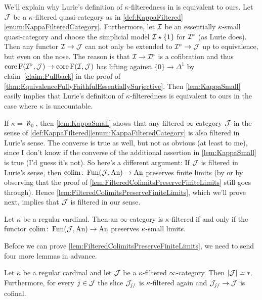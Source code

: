 \begin{rem}\label{rem:LuriesFilteredness}
	We'll explain why Lurie's definition of $\kappa$-filteredness in \cite[Definition~]{HTT} is equivalent to ours. Let $\mathcal{J}$ be a $\kappa$-filtered quasi-category as in \cref{def:KappaFiltered}\cref{enum:KappaFilteredCategory}. Furthermore, let $\mathcal{I}$ be an essentially $\kappa$-small quasi-category and choose the simplicial model $\mathcal{I}\star\{1\}$ for $\mathcal{I}^\triangleright$ (as Lurie does). Then any functor $\mathcal{I}\rightarrow\mathcal{J}$ can not only be extended to $\mathcal{I}^\triangleright\rightarrow\mathcal{J}$ up to equivalence, but even on the nose. The reason is that $\mathcal{I}\rightarrow\mathcal{I}^\triangleright$ is a cofibration and thus $\operatorname{core}\operatorname{F}(\mathcal{I}^\triangleright,\mathcal{J})\rightarrow \operatorname{core}\operatorname{F}(\mathcal{I},\mathcal{J})$ has lifting against $\{0\}\rightarrow\Delta^1$ by claim~\cref{claim:Pullback} in the proof of \cref{thm:EquivalenceFullyFaithfulEssentiallySurjective}. Then \cref{lem:KappaSmall} easily implies that Lurie's definition of $\kappa$-filteredness is equivalent to ours in the case where $\kappa$ is uncountable.
	
	If $\kappa=\aleph_0$, then \cref{lem:KappaSmall} shows that any filtered $\infty$-category $\mathcal{J}$ in the sense of \cref{def:KappaFiltered}\cref{enum:KappaFilteredCategory} is also filtered in Lurie's sense. The converse is true as well, but not as obvious (at least to me), since I don't know if the converse of the additional assertion in \cref{lem:KappaSmall} is true (I'd guess it's not). So here's a different argument: If $\mathcal{J}$ is filtered in Lurie's sense, then $\operatorname*{colim}\colon \operatorname{Fun}(\mathcal{J},\mathrm{An})\rightarrow\mathrm{An}$ preserves finite limits (by \cite[Proposition~]{HTT} or by observing that the proof of \cref{lem:FilteredColimitsPreserveFiniteLimits} still goes through). Hence \cref{lem:FilteredColimitsPreserveFiniteLimits}, which we'll prove next, implies that $\mathcal{J}$ is filtered in our sense. 
\end{rem}
\begin{lem}\label{lem:FilteredColimitsPreserveFiniteLimits}
	Let $\kappa$ be a regular cardinal. Then an $\infty$-category is $\kappa$-filtered if and only if the functor $\operatorname*{colim}\colon \operatorname{Fun}(\mathcal{J},\mathrm{An})\rightarrow\mathrm{An}$ preserves $\kappa$-small limits.
\end{lem}
Before we can prove \cref{lem:FilteredColimitsPreserveFiniteLimits}, we need to send four more lemmas in advance.%
\begin{lem}\label{lem:FilteredCofinal}
	Let $\kappa$ be a regular cardinal and let $\mathcal{J}$ be a $\kappa$-filtered $\infty$-category. Then $\left|\mathcal{J}\right|\simeq *$. Furthermore, for every $j\in\mathcal{J}$ the slice $\mathcal{J}_{j/}$ is $\kappa$-filtered again and $\mathcal{J}_{j/}\rightarrow \mathcal{J}$ is cofinal.
\end{lem}
